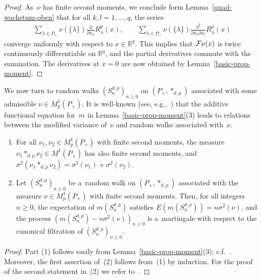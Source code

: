 \begin{proof}
As~$\nu$ has f\/inite second moments, we conclude form Lemma~\ref{quad-wachstum-oben} that for all $k,l=1,\ldots,q$, the
series
\begin{gather*}
\sum\limits_{\lambda\in P_+} \nu( \{\lambda\})
 \frac{\partial}{\partial x_k} R_\lambda^p(x),
\qquad
\sum\limits_{\lambda\in P_+} \nu(\{\lambda\})   \frac{\partial^2}{\partial x_k\partial x_l} R_\lambda^p(x)
\end{gather*}
converge uniformly with respect to $x\in\mathbb R^q$.
This implies that ${\cal F}\nu(x)$ is twice continuously dif\/ferentiable on $\mathbb R^q$, and the partial derivatives
commute with the summation.
The derivatives at $x=0$ are now obtained by Lemma~\ref{basic-prop-moment}.
\end{proof}

We now turn to random walks $(S_n^{d,p})_{n\ge0}$ on $(P_+,*_{d,p})$ associated with some admissible $\nu\in
M^1_p(P_+)$.
It is well-known (see, e.g.,~\cite[Section 7.3]{BH}) that the additive functional equation for~$m$ in
Lemma~\ref{basic-prop-moment}(3) leads to relations between the modif\/ied variance of~$\nu$ and random walks associated
with~$\nu$.

\begin{Lemma}%
\qquad
\begin{enumerate}\itemsep=-1pt
\item[$(1)$]
For all $\nu_1,\nu_2\in M^1_p(P_+)$ with finite second moments, the measure $\nu_1*_{d,p}\nu_2\in
M^1(P_+)$ has also finite second moments, and
$\sigma^2(\nu_1*_{d,p}\nu_2)= \sigma^2(\nu_1)+\sigma^2(\nu_2)$.

\item[$(2)$]
Let $(S_n^{d,p})_{n\ge0}$ be a~random walk on $(P_+,*_{d,p})$ associated with the measure $\nu \in
M^1_p(P_+)$ with finite second moments.
Then, for all integers $n\ge0$, the expectation of $m(S_n^{d,p})$ satisfies $E(m(S_n^{d,p}))=n\sigma^2(\nu)$, and the
process $(m(S_n^{d,p})-n\sigma^2(\nu))_{n\ge0}$
is a~martingale with respect to the canonical filtration of $(S_n^{d,p})_{n\ge0}$.
\end{enumerate}
\end{Lemma}

\begin{proof}
Part (1) follows easily from Lemma~\ref{basic-prop-moment}(3); c.f.~\cite[Section~7.3.7]{BH}.
Moreover, the f\/irst assertion of~(2) follows from~(1) by induction.
For the proof of the second statement in~(2) we refer to~\cite[Proposition 7.3.19]{BH}.
\end{proof}

